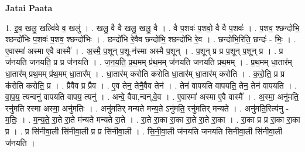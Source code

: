 \documentclass[17pt]{extarticle}
\begin{document}
\textbf{Jatai Paata} \newline

1. इ॒व॒ खलु॒ खल्वि॑वे व॒ खलु॑ । . खलु॒ वै वै खलु॒ खलु॒ वै । . वै प॒शवः॑ प॒शवो॒ वै वै प॒शवः॑ । . प॒शव॒ श्छन्दो॑भि॒ श्छन्दो॑भिः प॒शवः॑ प॒शव॒ श्छन्दो॑भिः । . छन्दो॑भि रे॒वैव छन्दो॑भि॒ श्छन्दो॑भि रे॒व । . छन्दो॑भि॒रिति॒ छन्दः॑ - भिः॒ । . ए॒वास्मा॑ अस्मा ए॒वै वास्मै᳚ । . अ॒स्मै॒ प॒शून् प॒शू-न॑स्मा अस्मै प॒शून् । . प॒शून् प्र प्र प॒शून् प॒शून् प्र । . प्र ज॑नयति जनयति॒ प्र प्र ज॑नयति । . ज॒न॒य॒ति॒ प्र॒थ॒मम् प्र॑थ॒मम् ज॑नयति जनयति प्रथ॒मम् । . प्र॒थ॒मम् धा॒तार॑म् धा॒तार॑म् प्रथ॒मम् प्र॑थ॒मम् धा॒तार᳚म् । . धा॒तार॑म् करोति करोति धा॒तार॑म् धा॒तार॑म् करोति । . क॒रो॒ति॒ प्र प्र क॑रोति करोति॒ प्र । . प्रैवैव प्र प्रैव । . ए॒व तेन॒ तेनै॒वैव तेन॑ । . तेन॑ वापयति वापयति॒ तेन॒ तेन॑ वापयति । . वा॒प॒य॒ त्यन्वनु॑ वापयति वापय॒ त्यनु॑ । . अन्वे॒ वैवा,न्वन्,वे॒व । . ए॒वास्मा॑ अस्मा ए॒वै वास्मै᳚ । . अ॒स्मा॒ अनु॑मति॒ रनु॑मति रस्मा अस्मा॒ अनु॑मतिः । . अनु॑मतिर् मन्यते मन्य॒ते ऽनु॑मति॒ रनु॑मतिर् मन्यते । . अनु॑मति॒रित्य॑नु - म॒तिः॒ । . म॒न्य॒ते॒ रा॒ते रा॒ते म॑न्यते मन्यते रा॒ते । . रा॒ते रा॒का रा॒का रा॒ते रा॒ते रा॒का । . रा॒का प्र प्र रा॒का रा॒का प्र । . प्र सि॑नीवा॒ली सि॑नीवा॒ली प्र प्र सि॑नीवा॒ली । . सि॒नी॒वा॒ली ज॑नयति जनयति सिनीवा॒ली सि॑नीवा॒ली ज॑नयति । \newline
\end{document}
